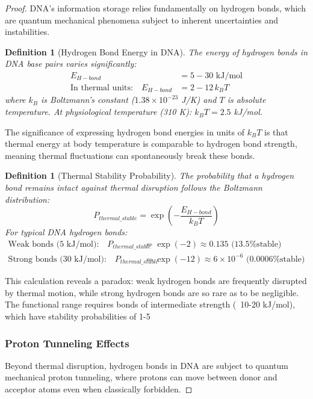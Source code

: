 \documentclass[12pt,a4paper]{article}
\newtheorem{definition}[theorem]{Definition}
\begin{document}
\begin{proof}
DNA's information storage relies fundamentally on hydrogen bonds, which are quantum mechanical phenomena subject to inherent uncertainties and instabilities.

\begin{definition}[Hydrogen Bond Energy in DNA]
The energy of hydrogen bonds in DNA base pairs varies significantly:
\begin{align}
E_{H-bond} &= 5-30 \text{ kJ/mol} \\
\text{In thermal units:} \quad E_{H-bond} &= 2-12 \, k_BT
\end{align}
where $k_B$ is Boltzmann's constant ($1.38 \times 10^{-23}$ J/K) and $T$ is absolute temperature.
At physiological temperature (310 K): $k_BT = 2.5$ kJ/mol.
\end{definition}

The significance of expressing hydrogen bond energies in units of $k_BT$ is that thermal energy at body temperature is comparable to hydrogen bond strength, meaning thermal fluctuations can spontaneously break these bonds.

\begin{definition}[Thermal Stability Probability]
The probability that a hydrogen bond remains intact against thermal disruption follows the Boltzmann distribution:
\begin{equation}
P_{thermal\_stable} = \exp\left(-\frac{E_{H-bond}}{k_BT}\right)
\end{equation}
For typical DNA hydrogen bonds:
\begin{align}
\text{Weak bonds (5 kJ/mol):} \quad P_{thermal\_stable} &= \exp(-2) \approx 0.135 \text{ (13.5\% stable)} \\
\text{Strong bonds (30 kJ/mol):} \quad P_{thermal\_stable} &= \exp(-12) \approx 6 \times 10^{-6} \text{ (0.0006\% stable)}
\end{align}
\end{definition}

This calculation reveals a paradox: weak hydrogen bonds are frequently disrupted by thermal motion, while strong hydrogen bonds are so rare as to be negligible. The functional range requires bonds of intermediate strength (~10-20 kJ/mol), which have stability probabilities of 1-5%

\subsubsection{Proton Tunneling Effects}

Beyond thermal disruption, hydrogen bonds in DNA are subject to quantum mechanical proton tunneling, where protons can move between donor and acceptor atoms even when classically forbidden.


\end{proof}
\end{document}
